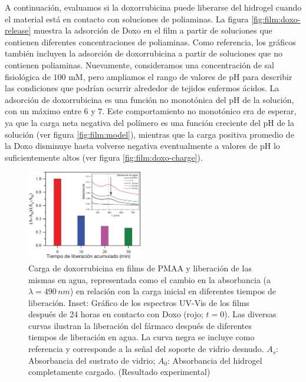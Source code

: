 A continuaci\'on, evaluamos si la doxorrubicina puede liberarse del hidrogel cuando el material est\'a en contacto con soluciones de poliaminas. La figura \ref{fig:film:doxo-release} muestra la adsorci\'on de Doxo en el film a partir de soluciones que contienen diferentes concentraciones de poliaminas. Como referencia, los gr\'aficos tambi\'en incluyen la adsorci\'on de doxorrubicina a partir de soluciones que no contienen poliaminas. Nuevamente, consideramos una concentraci\'on de sal fisiol\'ogica de $100$ mM, pero ampliamos el rango de valores de pH para describir las condiciones que podr\'ian ocurrir alrededor de tejidos enfermos \'acidos. La adsorci\'on de doxorrubicina es una funci\'on no monot\'onica del pH de la soluci\'on, con un m\'aximo entre $6$ y $7$. Este comportamiento no monot\'onico  era de esperar, ya que la carga neta negativa del pol\'imero es una funci\'on creciente del pH de la soluci\'on (ver figura \ref{fig:film:model}), mientras que la carga positiva promedio de la Doxo disminuye hasta volverse negativa eventualmente a valores de pH lo suficientemente altos (ver figura  \ref{fig:film:doxo-charge}).



\begin{figure}[!htb]
	\centering
	\includegraphics[width=0.45\textwidth]{Figures/graph-film/Release_water_2.pdf}
	\caption{Carga de doxorrubicina en films de PMAA y liberaci\'on de las mismas en agua, representada como el cambio en la absorbancia (a $\lambda=490 \,nm$) en relaci\'on con la carga inicial en diferentes tiempos de liberaci\'on.
		Inset: Gr\'afico de los espectros UV-Vis de los films despu\'es de 24 horas en contacto con Doxo (rojo; $t=0$).
		Las diversas curvas ilustran la liberaci\'on del f\'armaco despu\'es de diferentes tiempos de liberaci\'on en agua.
		La curva negra se incluye como referencia y corresponde a la se\~nal del soporte de vidrio desnudo. $A_s$: Absorbancia del sustrato de vidrio; $A_0$: Absorbancia del hidrogel completamente cargado. (Resultado experimental)}
	\label{fig:film:exp_doxo-water}
\end{figure}




